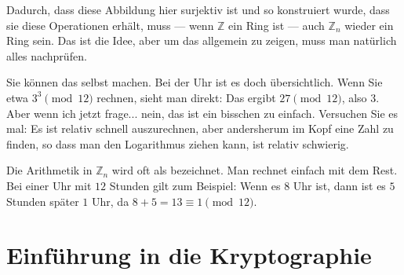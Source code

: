 \begin{spoken-clean}[00:14:17 - 00:17:11]
Dadurch, dass diese Abbildung hier surjektiv ist und so konstruiert wurde, dass sie diese Operationen erhält, muss --- wenn $\mathbb{Z}$ ein Ring ist --- auch $\mathbb{Z}_n$ wieder ein Ring sein. Das ist die Idee, aber um das allgemein zu zeigen, muss man natürlich alles nachprüfen.

Sie können das selbst machen. Bei der Uhr ist es doch übersichtlich. Wenn Sie etwa $3^3 \pmod{12}$ rechnen, sieht man direkt: Das ergibt $27 \pmod{12}$, also $3$. Aber wenn ich jetzt frage... nein, das ist ein bisschen zu einfach. Versuchen Sie es mal: Es ist relativ schnell auszurechnen, aber andersherum im Kopf eine Zahl zu finden, so dass man den Logarithmus ziehen kann, ist relativ schwierig.
\end{spoken-clean}

\begin{didactic-insight}
Die Arithmetik in $\mathbb{Z}_n$ wird oft als  bezeichnet. Man rechnet einfach mit dem Rest. Bei einer Uhr mit $12$ Stunden gilt zum Beispiel: Wenn es $8$ Uhr ist, dann ist es $5$ Stunden später $1$ Uhr, da $8 + 5 = 13 \equiv 1 \pmod{12}$.
\end{didactic-insight}

\section{Einführung in die Kryptographie}


